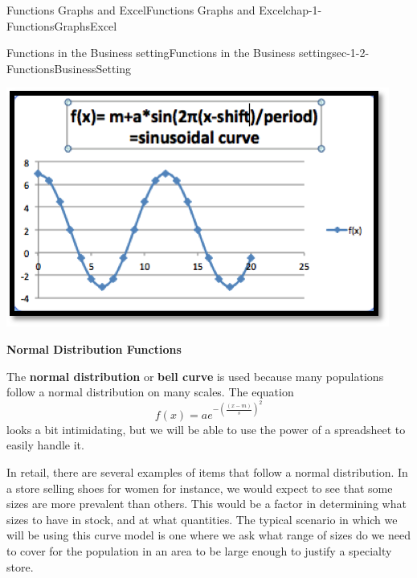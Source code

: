 \documentclass[oneside,10pt,]{book}
\newcommand{\terminology}[1]{\textbf{#1}}
\numberwithin{equation}{section}
\begin{document}
\begin{chapterptx}{Functions Graphs and Excel}{}{Functions Graphs and Excel}{}{}{chap-1-FunctionsGraphsExcel}
\begin{sectionptx}{Functions in the Business setting}{}{Functions in the Business setting}{}{}{sec-1-2-FunctionsBusinessSetting}
\begin{sidebyside}{1}{0.25}{0.25}{0}
\begin{sbspanel}{0.5}
\includegraphics[width=1\linewidth]{images/sec1-2-SinCurve.png}
\end{sbspanel}%
\end{sidebyside}%
\par
\hypertarget{p-159}{}%
\terminology{Normal Distribution Functions}%
\par
\hypertarget{p-160}{}%
The \terminology{normal distribution} or \terminology{bell curve} is used because many populations follow a normal distribution on many scales.  The equation%
%
\begin{equation*}
f(x)=a e^{-\left(\frac{(x-m)}{s}\right)^2} 
\end{equation*}
\hypertarget{p-161}{}%
looks a bit intimidating, but we will be able to use the power of a spreadsheet to easily handle it.%
\par
\hypertarget{p-162}{}%
In retail, there are several examples of items that follow a normal distribution. In a store selling shoes for women for instance, we would expect to see that some sizes are more prevalent than others. This would be a factor in determining what sizes to have in stock, and at what quantities. The typical scenario in which we will be using this curve model is one where we ask what range of sizes do we need to cover for the population in an area to be large enough to justify a specialty store.%
\begin{sidebyside}{1}{0.25}{0.25}{0}%
\begin{sbspanel}{0.5}%

\end{sbspanel}
\end{sidebyside}
\end{sectionptx}
\end{chapterptx}
\end{document}
